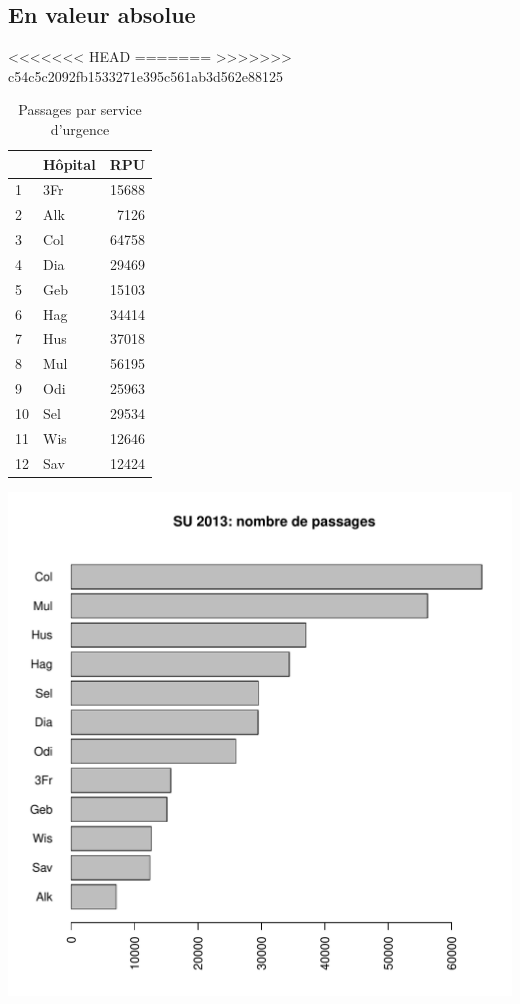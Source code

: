 \documentclass[12pt,english,french,twoside]{book}\usepackage[]{graphicx}\usepackage[]{color}
\makeatletter
\def\maxwidth{ %
  \ifdim\Gin@nat@width>\linewidth
    \linewidth
  \else
    \Gin@nat@width
  \fi
}
\makeatother
\begin{document}
\subsection*{En valeur absolue}
<<<<<<< HEAD
=======
>>>>>>> c54c5c2092fb1533271e395c561ab3d562e88125
\begin{table}[ht]
\centering
\begin{tabular}{llr}
  \hline
 & Hôpital & RPU \\ 
  \hline
1 & 3Fr & 15688 \\ 
  2 & Alk & 7126 \\ 
  3 & Col & 64758 \\ 
  4 & Dia & 29469 \\ 
  5 & Geb & 15103 \\ 
  6 & Hag & 34414 \\ 
  7 & Hus & 37018 \\ 
  8 & Mul & 56195 \\ 
  9 & Odi & 25963 \\ 
  10 & Sel & 29534 \\ 
  11 & Wis & 12646 \\ 
  12 & Sav & 12424 \\ 
   \hline
\end{tabular}
\caption[Nombre de passages par service d'urgence]{Passages par service d'urgence} 
\label{fig:passage_su}
\end{table}

\includegraphics[width=\maxwidth]{figure/val_abs} 
\end{document}
